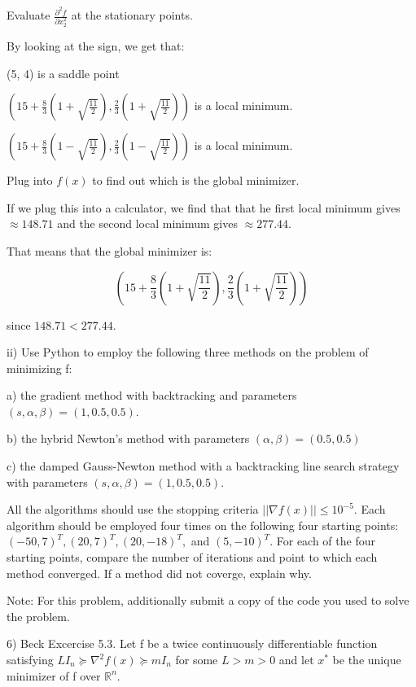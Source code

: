 \documentclass{article}
\newcommand{\RR}{\mathbb{R}}
\begin{document}
Evaluate $\frac{\partial^2 f}{\partial x_2^2}$ at the stationary points.


By looking at the sign, we get that:

(5, 4) is a saddle point

$\left( 15 + \frac{8}{3} \left( 1 + \sqrt{\frac{11}{2}} \right), \frac{2}{3} \left( 1 + \sqrt{\frac{11}{2}} \right) \right)$ is a local minimum.

$\left( 15 + \frac{8}{3} \left( 1 - \sqrt{\frac{11}{2}} \right), \frac{2}{3} \left( 1 - \sqrt{\frac{11}{2}} \right) \right)$ is a local minimum.

Plug into $f(x)$ to find out which is the global minimizer.

If we plug this into a calculator,
we find that that he first local minimum
gives $\approx 148.71$ and the second local minimum gives $\approx 277.44$.

That means that the global minimizer is:

\[\left( 15 + \frac{8}{3} \left( 1 + \sqrt{\frac{11}{2}} \right), \frac{2}{3} \left( 1 + \sqrt{\frac{11}{2}} \right) \right)\]

since $148.71 < 277.44$.



ii) Use Python to employ the following three methods on the problem of minimizing f:

a) the gradient method with backtracking and parameters $(s, \alpha, \beta) = (1, 0.5, 0.5)$.

b) the hybrid Newton's method with parameters $(\alpha, \beta) = (0.5, 0.5)$

c) the damped Gauss-Newton method with a backtracking line search strategy with
parameters $(s, \alpha, \beta) = (1, 0.5, 0.5).$

All the algorithms should use the stopping criteria $||\nabla f(x)|| \leq 10^{-5}$.
Each algorithm should be employed four times on the following four starting points:
$(-50, 7)^T, (20, 7)^T, (20, -18)^T,$ and $(5, -10)^T$. For each of the four starting
points, compare the number of iterations and point to which each method converged.
If a method did not coverge, explain why.

Note: For this problem, additionally submit a copy of
the code you used to solve the problem.


6) Beck Excercise 5.3. Let f be a twice continuously differentiable function
satisfying $L I_n \succeq \nabla^2 f(x) \succeq m I_n$ for some
$L > m > 0$ and let $x^{*}$ be the unique minimizer of f over $\RR^n$.
\end{document}
